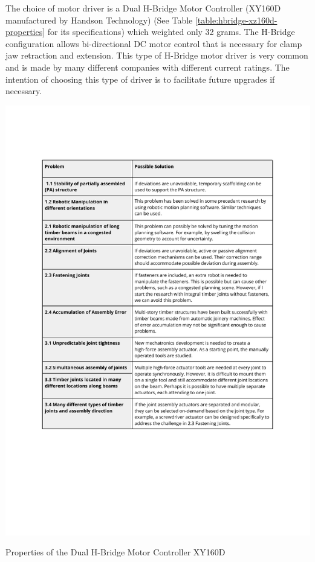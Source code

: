 The choice of motor driver is a Dual H-Bridge Motor Controller (XY160D manufactured by Handson Technology) (See Table \ref{table:hbridge-xz160d-properties} for its specifications) which weighted only 32 grams. The H-Bridge configuration allows bi-directional DC motor control that is necessary for clamp jaw retraction and extension. This type of H-Bridge motor driver is very common and is made by many different companies with different current ratings. The intention of choosing this type of driver is to facilitate future upgrades if necessary. 

\begin{table}[]
    \includegraphics[page=4, trim=25.4mm 210mm 25.4mm 33mm, clip, width=\textwidth]{tables/Tables in Chapter 4.pdf}
    \caption{Properties of the Dual H-Bridge Motor Controller XY160D}
    \label{table:hbridge-xz160d-properties}
\end{table}

